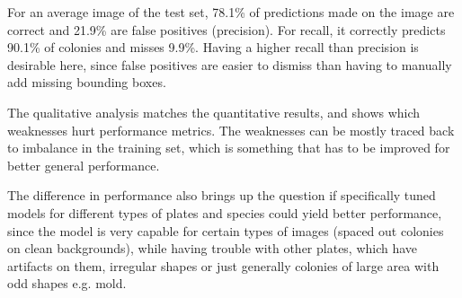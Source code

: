 For an average image of the test set, 78.1\% of predictions made on the image are correct and 21.9\% are false positives (precision). For recall, it correctly predicts 90.1\% of colonies and misses 9.9\%. Having a higher recall than precision is desirable here, since false positives are easier to dismiss than having to manually add missing bounding boxes.

The qualitative analysis matches the quantitative results, and shows which weaknesses hurt performance metrics. The weaknesses can be mostly traced back to imbalance in the training set, which is something that has to be improved for better general performance.

The difference in performance also brings up the question if specifically tuned models for different types of plates and species could yield better performance, since the model is very capable for certain types of images (spaced out colonies on clean backgrounds), while having trouble with other plates, which have artifacts on them, irregular shapes or just generally colonies of large area with odd shapes e.g. mold.
















